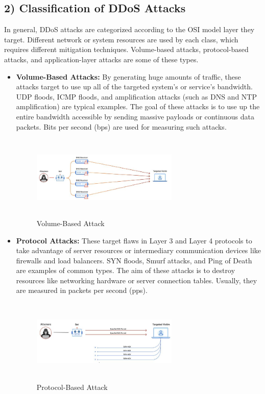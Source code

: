\documentclass[conference]{IEEEtran}
\begin{document}
\subsection*{2) Classification of DDoS Attacks}
In general, DDoS attacks are categorized according to the OSI model layer they target. Different network or system resources are used by each class, which requires different mitigation techniques. Volume-based attacks, protocol-based attacks, and application-layer attacks are some of these types. ~\cite{12}

\begin{itemize}
    \item \textbf{Volume-Based Attacks:} By generating huge amounts of traffic, these attacks target to use up all of the targeted system's or service's bandwidth. UDP floods, ICMP floods, and amplification attacks (such as DNS and NTP amplification) are typical examples. The goal of these attacks is to use up the entire bandwidth accessible by sending massive payloads or continuous data packets. Bits per second (bps) are used for measuring such attacks.

    \begin{figure}[htbp]
    \centerline{\includegraphics[height=4cm,width=7cm]{VolumeBasedAttack.JPG}}
    \caption{Volume-Based Attack~\cite{13}}
    \label{fig:volume_attack}
    \end{figure}

    \item \textbf{Protocol Attacks:} These target flaws in Layer 3 and Layer 4 protocols to take advantage of server resources or intermediary communication devices like firewalls and load balancers. SYN floods, Smurf attacks, and Ping of Death are examples of common types. The aim of these attacks is to destroy resources like networking hardware or server connection tables. Usually, they are measured in packets per second (pps).

    \begin{figure}[htbp]
    \centerline{\includegraphics[height=4cm,width=7cm]{ProtocolAttack.JPG}}
    \caption{Protocol-Based Attack~\cite{13}}
    \label{fig:protocol_attack}
    \end{figure}


\end{itemize}
\end{document}
